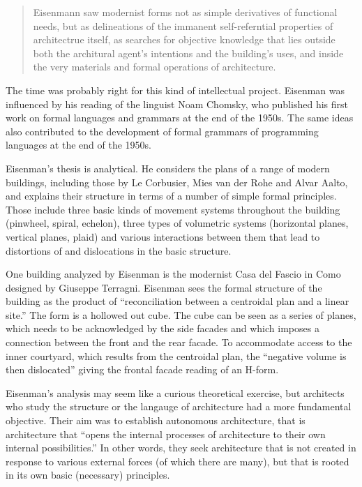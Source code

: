 \begin{quote}
Eisenmann saw modernist forms not as simple derivatives of functional needs, but as
delineations of the immanent self-referntial properties of architectrue itself,
as searches for objective knowledge that lies outside both the architural agent's intentions
and the building's uses, and inside the very materials and formal operations of
architecture.
\end{quote}

The time was probably right for this kind of intellectual project.
Eisenman was influenced by his reading of the linguist Noam Chomsky,
who published his first work on formal languages and grammars at the end of the 1950s. The
same ideas also contributed to the development of formal grammars of programming languages at
the end of the 1950s.

Eisenman's thesis is analytical. He considers the plans of a range of modern buildings,
including those by Le Corbusier, Mies van der Rohe and Alvar Aalto, and explains their
structure in terms of a number of simple formal principles. Those include three basic
kinds of movement systems throughout the building (pinwheel, spiral, echelon), three types
of volumetric systems (horizontal planes, vertical planes, plaid) and various interactions
between them that lead to distortions of and dislocations in the basic structure.

One building analyzed by Eisenman is the modernist Casa del Fascio in Como designed by
Giuseppe Terragni. Eisenman sees the formal structure of the building as the product of
``reconciliation between a centroidal plan and a linear site.''
The form is a hollowed out cube. The cube can be seen as a series of planes, which needs
to be acknowledged by the side facades and which imposes a connection between the front and
the rear facade. To accommodate access to the inner courtyard, which results from the centroidal
plan, the ``negative volume is then dislocated'' giving the frontal facade reading of
an H-form.

Eisenman's analysis may seem like a curious theoretical exercise, but architects who study
the structure or the langauge of architecture had a more fundamental objective. Their aim
was to establish autonomous architecture, that is architecture that ``opens the internal
processes of architecture to their own internal possibilities.'' In other words, they seek architecture that is not created in response
to various external forces (of which there are many), but that is rooted in its own basic
(necessary) principles.

